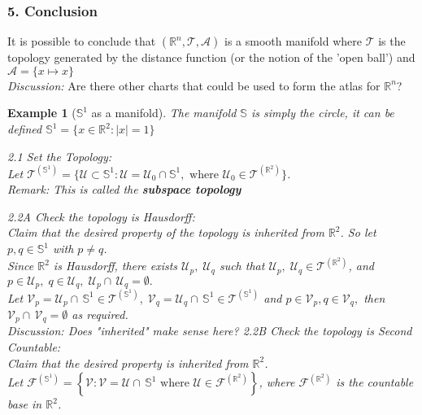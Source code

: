 \documentclass[11pt]{report}
\theoremstyle{thm}
\newtheorem{example}{Example}
\newcommand{\textem}[1]{\textcolor{mp}{\textbf{#1}}}
\newcommand{\bluetxt}[1]{\textcolor{mp}{#1}}
\newcommand{\vpi}[0]{\medskip \par \noindent}
\begin{document}
\subsubsection{5. Conclusion}
It is possible to conclude that $(\mathbb{R}^n, \mathcal{T}, \mathcal{A})$ is a smooth manifold where $\mathcal{T}$ is the topology generated by the distance function (or the notion of the 'open ball') and $\mathcal{A}=\{x \mapsto x \}$\\[1em]
\textit{Discussion:} Are there other charts that could be used to form the atlas for $\mathbb{R}^n$?
\newpage\noindent
\begin{example}[$\mathbb{S}^1$ as a manifold]
The manifold $\mathbb{S}$ is simply the circle, it can be defined $\mathbb{S}^1 = \{x \in \mathbb{R}^2: |x|=1 \}$\\
\vpi
\bluetxt{2.1 Set the Topology:}\\[1em]
Let $\mathcal{T}^{(\mathbb{S}^1)} = \{\mathcal{U} \subset \mathbb{S}^1: \mathcal{U}=\mathcal{U}_0 \cap \mathbb{S}^1,\text{ where } \mathcal{U}_0 \in \mathcal{T}^{(\mathbb{R}^2)} \}$.\\
\textit{Remark:} This is called the \textem{subspace topology}\\
\vpi
\bluetxt{2.2A Check the topology is Hausdorff:}\\[1em]
Claim that the desired property of the topology is inherited from $\mathbb{R}^2$. So let $p, q \in \mathbb{S}^1$ with $p \ne q$.\\[1em]
Since $\mathbb{R}^2$ is Hausdorff, there exists $\mathcal{U}_p,\; \mathcal{U}_q$ such that $\mathcal{U}_p,\;\mathcal{U}_q \in \mathcal{T}^{(\mathbb{R}^2)}$, and $p \in \mathcal{U}_p,\; q \in \mathcal{U}_q,\; \mathcal{U}_p\cap\,\mathcal{U}_q=\emptyset.$\\[1em]
Let $\mathcal{V}_p =\mathcal{U}_p\cap\,\mathbb{S}^1 \in \mathcal{T}^{(\mathbb{S}^1)},\; \mathcal{V}_q =\mathcal{U}_q\cap\,\mathbb{S}^1 \in \mathcal{T}^{(\mathbb{S}^1)}$ and $p\in \mathcal{V}_p, q\in \mathcal{V}_q,$ then $ \mathcal{V}_p \cap\,\mathcal{V}_q = \emptyset$ as required.\\[1em]
\textit{Discussion:} Does "inherited" make sense here?
\newpage \noindent
\bluetxt{2.2B Check the topology is Second Countable:}\\[1em]
Claim that the desired property is inherited from $\mathbb{R}^2$.\\[1em]
Let $\mathcal{F}^{(\mathbb{S}^1)}= \left\{\mathcal{V}: \mathcal{V} = \mathcal{U}\cap\,\mathbb{S}^1 \text{ where } \mathcal{U} \in \mathcal{F}^{(\mathbb{R}^2)} \right\}$, where $\mathcal{F}^{(\mathbb{R}^2)}$ is the countable base in $\mathbb{R}^2$.\\[1em]

\end{example}
\end{document}
